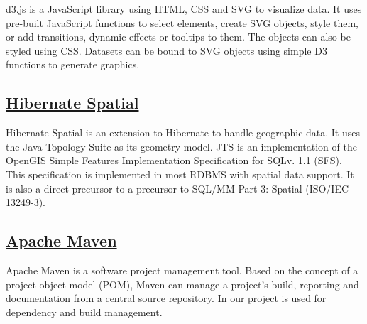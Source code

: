 d3.js is a JavaScript library using HTML, CSS and SVG to visualize data.
It uses pre-built JavaScript functions to select elements, create SVG
objects, style them, or add transitions, dynamic effects or tooltips to
them. The objects can also be styled using CSS. Datasets can be bound to
SVG objects using simple D3 functions to generate graphics.

\subsection{\href{http://www.hibernatespatial.org/}{\textbf{Hibernate
Spatial}}}\label{hibernate-spatial}

Hibernate Spatial is an extension to Hibernate to handle geographic
data. It uses the Java Topology Suite as its geometry model. JTS is an
implementation of the OpenGIS Simple Features Implementation
Specification for SQLv. 1.1 (SFS). This specification is implemented in
most RDBMS with spatial data support. It is also a direct precursor to a
precursor to SQL/MM Part 3: Spatial (ISO/IEC 13249-3).

\subsection{\href{http://maven.apache.org/}{\textbf{Apache
Maven}}}\label{apache-maven}

Apache Maven is a software project management tool. Based on the concept
of a project object model (POM), Maven can manage a project's build,
reporting and documentation from a central source repository. In our
project is used for dependency and build management.
